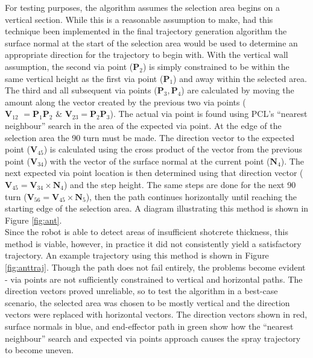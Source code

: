 For testing purposes, the algorithm assumes the selection area begins on a vertical section. While this is a reasonable assumption to make, had this technique been implemented in the final trajectory generation algorithm the surface normal at the start of the selection area would be used to determine an appropriate direction for the trajectory to begin with. With the vertical wall assumption, the second via point ($\mathbf{P}_2$) is simply constrained to be within the same vertical height as the first via point ($\mathbf{P}_1$) and  away within the selected area. The third and all subsequent via points ($\mathbf{P}_3,\mathbf{P}_4$) are calculated by moving the  amount along the vector created by the previous two via points ($\mathbf{V}_{12}\hspace{4pt} = \mathbf{P}_1\mathbf{P}_2\hspace{4pt} \& \hspace{4pt}\mathbf{V}_{23} = \mathbf{P}_2\mathbf{P}_3$). The actual via point is found using PCL's  ``nearest neighbour'' search in the area of the expected via point. At the edge of the selection area the 90\degree\hspace{0pt} turn must be made. The direction vector to the expected point ($\mathbf{V}_{45}$) is calculated using the cross product of the vector from the previous point ($\mathbf{V}_{34}$) with the vector of the surface normal at the current point ($\mathbf{N}_4$). The next expected via point location is then determined using that direction vector ($\mathbf{V}_{45} = \mathbf{V}_{34} \times \mathbf{N}_4$) and the step height. The same steps are done for the next 90\degree\hspace{0pt} turn ($\mathbf{V}_{56} = \mathbf{V}_{45} \times \mathbf{N}_5$), then the path continues horizontally until reaching the starting edge of the selection area. A diagram illustrating this method is shown in Figure \ref{fig:ant}.\\


Since the robot is able to detect areas of insufficient shotcrete thickness, this method is viable, however, in practice it did not consistently yield a satisfactory trajectory. An example trajectory using this method is shown in Figure \ref{fig:anttraj}. Though the path does not fail entirely, the problems become evident - via points are not sufficiently constrained to vertical and horizontal paths. The direction vectors proved unreliable, so to test the algorithm in a best-case scenario, the selected area was chosen to be mostly vertical and the direction vectors were replaced with horizontal vectors. The direction vectors shown in red, surface normals in blue, and end-effector path in green show how the ``nearest neighbour'' search and expected via points approach causes the spray trajectory to become uneven.\\

